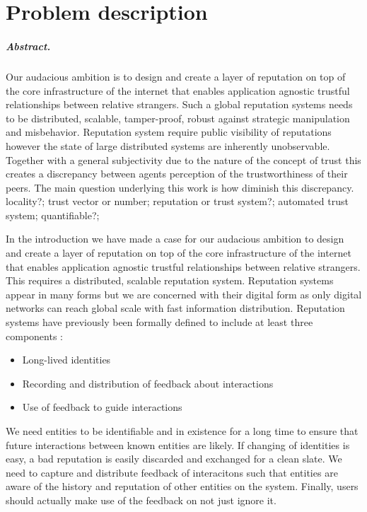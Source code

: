 \chapter{Problem description}
\label{chap:problem}
\paragraph{Abstract.} Our audacious ambition is to design and create a layer of reputation on top of the core infrastructure of the internet that enables application agnostic trustful relationships between relative strangers. Such a global reputation systems needs to be distributed, scalable, tamper-proof, robust against strategic manipulation and misbehavior. Reputation system require public visibility of reputations however the state of large distributed systems are inherently unobservable. Together with a general subjectivity due to the nature of the concept of trust this creates a discrepancy between agents perception of the trustworthiness of their peers. The main question underlying this work is how diminish this discrepancy. 
locality?; trust vector or number; reputation or trust system?; automated trust system; quantifiable?;  


In the introduction we have made a case for our audacious ambition to design and create a layer 
of reputation on top of the core infrastructure of the internet that enables application agnostic 
trustful relationships between relative strangers. This requires a distributed, scalable reputation
system. Reputation systems appear in many forms but we are concerned with their digital form as only
digital networks can reach global scale with fast information distribution. Reputation systems have
previously been formally defined to include at least three components \cite{resnick2000}:

\begin{itemize}
    \item Long-lived identities
    \item Recording and distribution of feedback about interactions
    \item Use of feedback to guide interactions
\end{itemize}

We need entities to be identifiable and in existence for a long time to ensure that future interactions
between known entities are likely. If changing of identities is easy, a bad reputation is easily 
discarded and exchanged for a clean slate. We need to capture and distribute feedback of interacitons
such that entities are aware of the history and reputation of other entities on the system. Finally,
users should actually make use of the feedback on not just ignore it.

